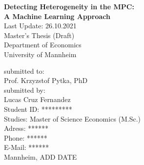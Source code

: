 \begin{titlepage}

\begin{center}

\vspace*{1,2cm}

\Large {\bfseries Detecting Heterogeneity in the MPC: \\ A Machine Learning Approach}\\[2cm]
\large {Last Update: 26.10.2021}\\[1cm]

\large {Master's Thesis (Draft)}\\[1cm]
\large {Department of Economics}\\[0.2cm]

\large {University of Mannheim}\\[0.5cm]

\end{center}

\vfill

\noindent submitted to:\\
Prof. Krzyzstof Pytka, PhD\\[0.5cm]
submitted by:\\
Lucas Cruz Fernandez\\[0.5cm]
Student ID: *********\\
Studies: Master of Science Economics (M.Sc.)\\[0.5cm]
Adress: ****** \\
Phone: ****** \\
E-Mail: ****** \\[0.5cm]
Mannheim, ADD DATE

\setcounter{page}{0}

\end{titlepage}
